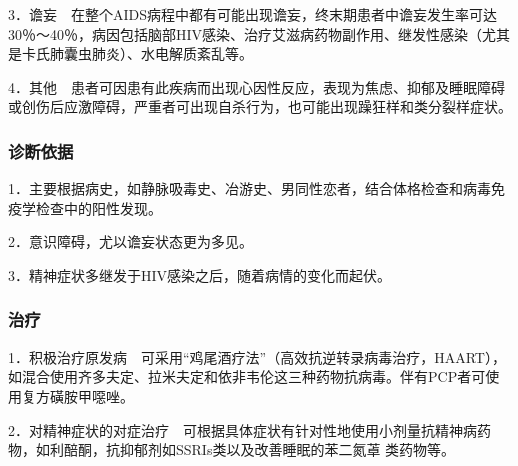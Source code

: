 3．谵妄　在整个AIDS病程中都有可能出现谵妄，终末期患者中谵妄发生率可达30％～40％，病因包括脑部HIV感染、治疗艾滋病药物副作用、继发性感染（尤其是卡氏肺囊虫肺炎）、水电解质紊乱等。

4．其他　患者可因患有此疾病而出现心因性反应，表现为焦虑、抑郁及睡眠障碍或创伤后应激障碍，严重者可出现自杀行为，也可能出现躁狂样和类分裂样症状。

\subsubsection{诊断依据}

1．主要根据病史，如静脉吸毒史、冶游史、男同性恋者，结合体格检查和病毒免疫学检查中的阳性发现。

2．意识障碍，尤以谵妄状态更为多见。

3．精神症状多继发于HIV感染之后，随着病情的变化而起伏。

\subsubsection{治疗}

1．积极治疗原发病　可采用``鸡尾酒疗法''（高效抗逆转录病毒治疗，HAART），如混合使用齐多夫定、拉米夫定和依非韦伦这三种药物抗病毒。伴有PCP者可使用复方磺胺甲噁唑。

2．对精神症状的对症治疗　可根据具体症状有针对性地使用小剂量抗精神病药物，如利醅酮，抗抑郁剂如SSRIs类以及改善睡眠的苯二氮䓬
类药物等。


